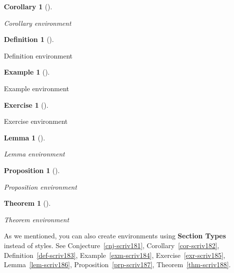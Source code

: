 \documentclass[
  12pt,
  a4paper,
  oneside,
  titlepage,
  toclink=all,
  toc=bibliography]{scrbook}
\theoremstyle{plain}
\newtheorem{theorem}{Theorem}[section]
\theoremstyle{plain}
\newtheorem{corollary}{Corollary}[section]
\theoremstyle{definition}
\newtheorem{exercise}{Exercise}[section]
\theoremstyle{definition}
\newtheorem{definition}{Definition}[section]
\theoremstyle{plain}
\newtheorem{proposition}{Proposition}[section]
\theoremstyle{plain}
\newtheorem{lemma}{Lemma}[section]
\theoremstyle{plain}
\theoremstyle{definition}
\newtheorem{example}{Example}[section]
\theoremstyle{remark}
\begin{document}
\begin{corollary}[]\protect\hypertarget{cor-scriv180}{}\label{cor-scriv180}

Corollary environment

\end{corollary}

\begin{definition}[]\protect\hypertarget{def-scriv180}{}\label{def-scriv180}

Definition environment

\end{definition}

\begin{example}[]\protect\hypertarget{exm-scriv180}{}\label{exm-scriv180}

Example environment

\end{example}

\begin{exercise}[]\protect\hypertarget{exr-scriv180}{}\label{exr-scriv180}

Exercise environment

\end{exercise}

\begin{lemma}[]\protect\hypertarget{lem-scriv180}{}\label{lem-scriv180}

Lemma environment

\end{lemma}

\begin{proposition}[]\protect\hypertarget{prp-scriv180}{}\label{prp-scriv180}

Proposition environment

\end{proposition}

\begin{theorem}[]\protect\hypertarget{thm-scriv180}{}\label{thm-scriv180}

Theorem environment

\end{theorem}

As we mentioned, you can also create environments using \textbf{Section
Types} instead of styles. See
\protect\hypertarget{cite_46}{}{\label{cite_46}Conjecture~\ref{cnj-scriv181}},
\protect\hypertarget{cite_47}{}{\label{cite_47}Corollary~\ref{cor-scriv182}},
\protect\hypertarget{cite_48}{}{\label{cite_48}Definition~\ref{def-scriv183}},
\protect\hypertarget{cite_49}{}{\label{cite_49}Example~\ref{exm-scriv184}},
\protect\hypertarget{cite_50}{}{\label{cite_50}Exercise~\ref{exr-scriv185}},
\protect\hypertarget{cite_51}{}{\label{cite_51}Lemma~\ref{lem-scriv186}},
\protect\hypertarget{cite_52}{}{\label{cite_52}Proposition~\ref{prp-scriv187}},
\protect\hypertarget{cite_53}{}{\label{cite_53}Theorem~\ref{thm-scriv188}}.
\end{document}
